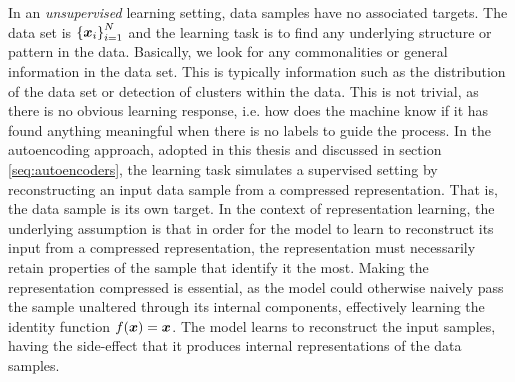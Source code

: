 In an \textit{unsupervised} learning setting, data samples have no associated targets. The data set is ${\mathopen{} \left\{ \bm{ x }_i \right\} \mathclose{}}_{i=1}^N$ and the learning task is to find any underlying structure or pattern in the data. Basically, we look for any commonalities or general information in the data set. This is typically information such as the distribution of the data set or detection of clusters within the data. This is not trivial, as there is no obvious learning response, i.e. how does the machine know if it has found anything meaningful when there is no labels to guide the process. In the autoencoding approach, adopted in this thesis and discussed in section \ref{seq:autoencoders}, the learning task simulates a supervised setting by reconstructing an input data sample from a compressed representation. That is, the data sample is its own target. In the context of representation learning, the underlying assumption is that in order for the model to learn to reconstruct its input from a compressed representation, the representation must necessarily retain properties of the sample that identify it the most. Making the representation compressed is essential, as the model could otherwise naively pass the sample unaltered through its internal components, effectively learning the identity function $f(\bm{ x }) = \bm{ x }$. The model learns to reconstruct the input samples, having the side-effect that it produces internal representations of the data samples. 



